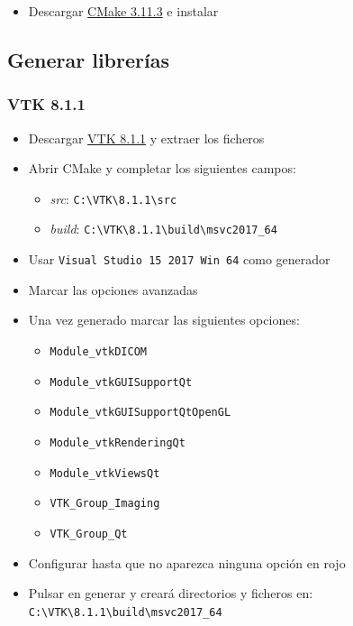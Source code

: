 \begin{itemize}
	\item Descargar \href{https://cmake.org/files/v3.11/cmake-3.11.3-win64-x64.msi}{CMake 3.11.3} e instalar
\end{itemize}

\subsection{Generar librerías}

\subsubsection{VTK 8.1.1}

\begin{itemize}
	\item Descargar \href{http://www.vtk.org/files/release/8.1/VTK-8.1.1.zip}{VTK 8.1.1} y extraer los ficheros
	\item Abrir CMake y completar los siguientes campos:
	\begin{itemize}
		\item \textit{src}: \texttt{C:\textbackslash VTK\textbackslash 8.1.1\textbackslash src}
		\item \textit{build}: \texttt{C:\textbackslash VTK\textbackslash 8.1.1\textbackslash build\textbackslash msvc2017\_64}
	\end{itemize}
	\item Usar \texttt{Visual Studio 15 2017 Win 64} como generador
	\item Marcar las opciones avanzadas
	\item Una vez generado marcar las siguientes opciones:
	\begin{itemize}
		\item \texttt{Module\_vtkDICOM}
		\item \texttt{Module\_vtkGUISupportQt}
		\item \texttt{Module\_vtkGUISupportQtOpenGL}
		\item \texttt{Module\_vtkRenderingQt}
		\item \texttt{Module\_vtkViewsQt}
		\item \texttt{VTK\_Group\_Imaging}
		\item \texttt{VTK\_Group\_Qt}
	\end{itemize}
	\item Configurar hasta que no aparezca ninguna opción en rojo
	\item Pulsar en generar y creará directorios y ficheros en: \\ \texttt{C:\textbackslash VTK\textbackslash 8.1.1\textbackslash build\textbackslash msvc2017\_64}
\end{itemize}

